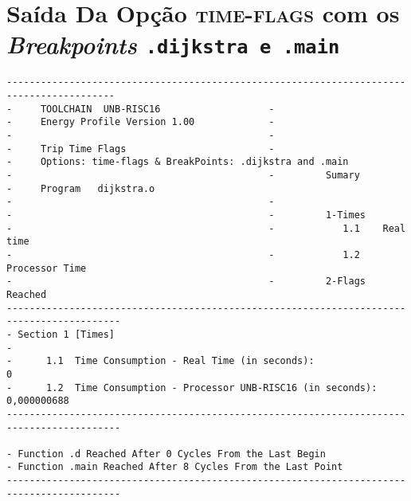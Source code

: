 


\section{Saída Da Opção \textsc{time-flags} com os \textit{Breakpoints} \texttt{.dijkstra e .main}}

\scriptsize
\begin{verbatim}
-----------------------------------------------------------------------------------------
-     TOOLCHAIN  UNB-RISC16                   -                                          
-     Energy Profile Version 1.00             -                                            
-                                             -                                            
-     Trip Time Flags                         -                                            
-     Options: time-flags & BreakPoints: .dijkstra and .main 
-                                             -         Sumary                       
-     Program   dijkstra.o
-                                             -                                      
-                                             -         1-Times                      
-                                             -            1.1    Real time           
-                                             -            1.2    Processor Time      
-                                             -         2-Flags Reached
------------------------------------------------------------------------------------------
- Section 1 [Times]                                                                       
-                                                                                         
-      1.1  Time Consumption - Real Time (in seconds):                 0                 
-      1.2  Time Consumption - Processor UNB-RISC16 (in seconds):      0,000000688                  
------------------------------------------------------------------------------------------

- Function .d Reached After 0 Cycles From the Last Begin                
- Function .main Reached After 8 Cycles From the Last Point                
------------------------------------------------------------------------------------------

\end{verbatim}

